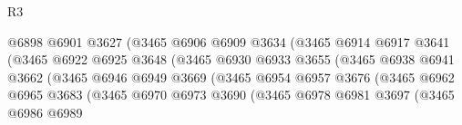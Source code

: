 \begin{lexlean}{R3}
\begin{coremodule}
                                        @6898
                                        @6901
                                        @3627
                                        (@3465
                                          @6906
                                          @6909
                                          @3634
                                          (@3465
                                            @6914
                                            @6917
                                            @3641
                                            (@3465
                                              @6922
                                              @6925
                                              @3648
                                              (@3465
                                                @6930
                                                @6933
                                                @3655
                                                (@3465
                                                  @6938
                                                  @6941
                                                  @3662
                                                  (@3465
                                                    @6946
                                                    @6949
                                                    @3669
                                                    (@3465
                                                      @6954
                                                      @6957
                                                      @3676
                                                      (@3465
                                                        @6962
                                                        @6965
                                                        @3683
                                                        (@3465
                                                          @6970
                                                          @6973
                                                          @3690
                                                          (@3465
                                                            @6978
                                                            @6981
                                                            @3697
                                                            (@3465
                                                              @6986
                                                              @6989

\end{coremodule}
\end{lexlean}
